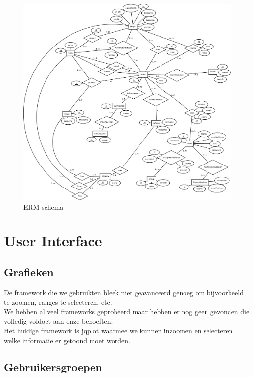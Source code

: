 \documentclass[11pt]{article}
\begin{document}
\begin{figure}[h!]
	\begin{center}
	\includegraphics[scale=0.11]{ERM2.png}

	\caption{ERM schema}
	\label{fig:speler}
	\end{center}
\end{figure}
\section{User Interface}


\subsection{Grafieken}

De framework die we gebruikten bleek niet geavanceerd genoeg om bijvoorbeeld te zoomen, ranges te selecteren, etc.\\
We hebben al veel frameworks geprobeerd maar hebben er nog geen gevonden die volledig voldoet aan onze behoeften.\\
Het huidige framework is jqplot waarmee we kunnen inzoomen en selecteren welke informatie er getoond moet worden.



\subsection{Gebruikersgroepen}
\end{document}
